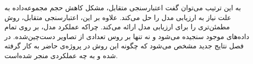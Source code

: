به این ترتیب می‌توان گفت اعتبارسنجی متقابل، مشکل کاهش حجم مجموعه‌داده به علت نیاز به ارزیابی مدل را حل می‌کند.
علاوه بر این، اعتبارسنجی متقابل، روش مطمئن‌تری را برای ارزیابی مدل ارائه می‌کند.
چراکه عملکرد مدل، بر روی تمام داده‌های موجود سنجیده می‌شود و نه تنها بر روس تعدادی از تصاویر دست‌چین‌شده.
در فصل نتایج جدید مشخص می‌شود که چگونه این روش در پروژه‌ی حاضر به کار گرفته شده و به چه عملکردی منجر شده‌است.